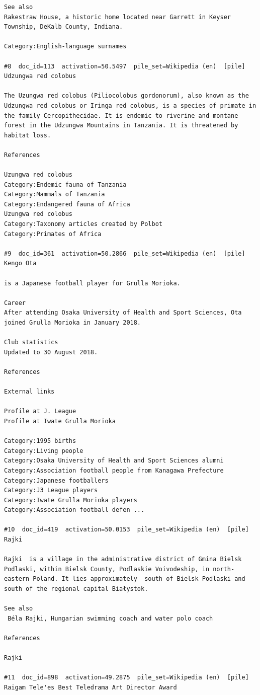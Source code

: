 \begin{verbatim}
See also
Rakestraw House, a historic home located near Garrett in Keyser Township, DeKalb County, Indiana.

Category:English-language surnames

#8  doc_id=113  activation=50.5497  pile_set=Wikipedia (en)  [pile]
Udzungwa red colobus

The Uzungwa red colobus (Piliocolobus gordonorum), also known as the Udzungwa red colobus or Iringa red colobus, is a species of primate in the family Cercopithecidae. It is endemic to riverine and montane forest in the Udzungwa Mountains in Tanzania. It is threatened by habitat loss.

References

Uzungwa red colobus
Category:Endemic fauna of Tanzania
Category:Mammals of Tanzania
Category:Endangered fauna of Africa
Uzungwa red colobus
Category:Taxonomy articles created by Polbot
Category:Primates of Africa

#9  doc_id=361  activation=50.2866  pile_set=Wikipedia (en)  [pile]
Kengo Ota

is a Japanese football player for Grulla Morioka.

Career
After attending Osaka University of Health and Sport Sciences, Ota joined Grulla Morioka in January 2018.

Club statistics
Updated to 30 August 2018.

References

External links

Profile at J. League
Profile at Iwate Grulla Morioka

Category:1995 births
Category:Living people
Category:Osaka University of Health and Sport Sciences alumni
Category:Association football people from Kanagawa Prefecture
Category:Japanese footballers
Category:J3 League players
Category:Iwate Grulla Morioka players
Category:Association football defen ...

#10  doc_id=419  activation=50.0153  pile_set=Wikipedia (en)  [pile]
Rajki

Rajki  is a village in the administrative district of Gmina Bielsk Podlaski, within Bielsk County, Podlaskie Voivodeship, in north-eastern Poland. It lies approximately  south of Bielsk Podlaski and  south of the regional capital Białystok.

See also
 Béla Rajki, Hungarian swimming coach and water polo coach

References

Rajki

#11  doc_id=898  activation=49.2875  pile_set=Wikipedia (en)  [pile]
Raigam Tele'es Best Teledrama Art Director Award


\end{verbatim}
